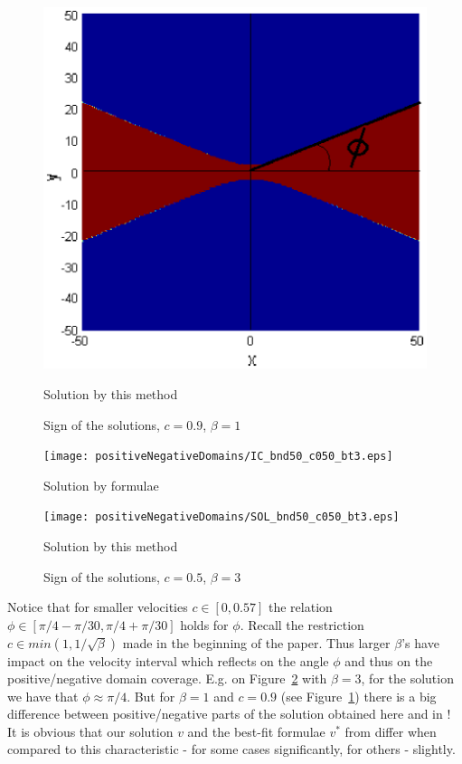 \documentclass[preprint]{elsarticle}
\begin{document}
\begin{figure}[htbp]
\begin{minipage}[b]{0.45\linewidth}
		\includegraphics[width=\linewidth]{positiveNegativeDomains/SOL_bnd50_c090_bt1.eps}
		\centerline{Solution  by this method}
	\end{minipage}
	\caption{Sign of the solutions, $c=0.9$, $\beta = 1$}
	\label{fig:c09beta1}
\end{figure}

\begin{figure}[htbp]
	\begin{minipage}[b]{0.45\linewidth}
		\raggedleft
		\texttt{[image: positiveNegativeDomains/IC\_bnd50\_c050\_bt3.eps]}
		\centerline{Solution  by formulae \cite{Ch2011}}
	\end{minipage}
	\begin{minipage}[b]{0.45\linewidth}
		 \raggedright
		\texttt{[image: positiveNegativeDomains/SOL\_bnd50\_c050\_bt3.eps]}
		\centerline{Solution  by this method}
	\end{minipage}
	\caption{Sign of the solutions, $c=0.5$, $\beta = 3$}
	\label{fig:c05beta3}
\end{figure}

Notice that for smaller velocities $c \in [0, 0.57]$  the relation $\phi \in [\pi/4-\pi/30, \pi/4+\pi/30]$ holds for $\phi$. Recall the restriction $c \in min(1,1/\sqrt{\beta})$ made in the beginning of the paper. 
Thus larger $\beta$'s have impact on the velocity interval which reflects on the angle $\phi$ and thus on the positive/negative domain coverage. E.g. on Figure~\ref{fig:c05beta3} with $\beta = 3$, for the solution we have that $\phi \approx \pi/4$. 
But for $\beta = 1$ and $c=0.9$ (see Figure~\ref{fig:c09beta1}) there is a big difference between positive/negative parts of the solution obtained here and in \cite{Ch2011}! 
It is obvious that our solution $v$ and the best-fit  formulae $v^*$ from \cite{Ch2011} differ when compared to this characteristic - for some cases significantly, for others - slightly.
\end{document}
